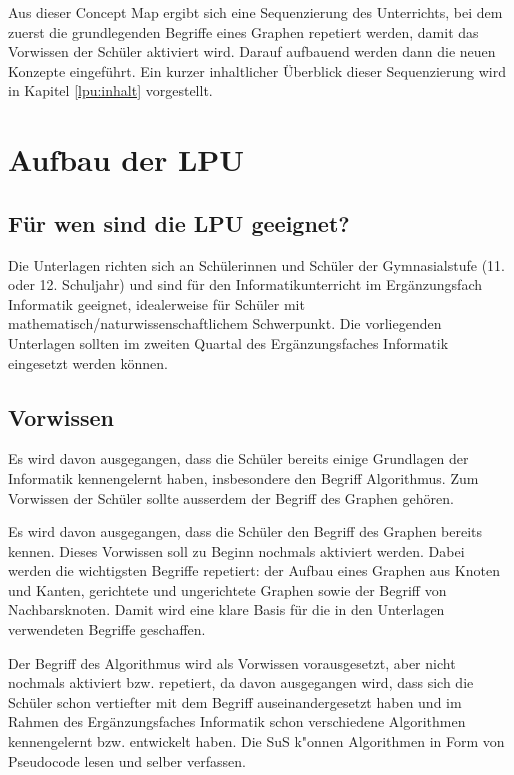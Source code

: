 Aus dieser Concept Map ergibt sich eine Sequenzierung des Unterrichts, bei dem zuerst die grundlegenden Begriffe eines Graphen repetiert werden, damit das Vorwissen der Sch\"uler aktiviert wird. Darauf aufbauend werden dann die neuen Konzepte eingef\"uhrt. Ein kurzer inhaltlicher \"Uberblick dieser Sequenzierung wird in Kapitel \ref{lpu:inhalt} vorgestellt.

\section{Aufbau der LPU}

\subsection{F\"ur wen sind die LPU geeignet?}
Die Unterlagen richten sich an Sch\"ulerinnen und Sch\"uler der Gymnasialstufe (11. oder 12. Schuljahr) und sind f\"ur den Informatikunterricht im Erg\"anzungsfach Informatik geeignet, idealerweise f\"ur Sch\"uler mit mathematisch/naturwissenschaftlichem Schwerpunkt. 
Die vorliegenden Unterlagen sollten im zweiten Quartal des Erg\"anzungsfaches Informatik eingesetzt werden k\"onnen.


\subsection{Vorwissen}

Es wird davon ausgegangen, dass die Sch\"uler bereits einige Grundlagen der Informatik kennengelernt haben, insbesondere den Begriff Algorithmus. Zum Vorwissen der Sch\"uler sollte ausserdem der Begriff des Graphen geh\"oren. 
  

Es wird davon ausgegangen, dass die Sch\"uler den Begriff des Graphen bereits kennen. Dieses Vorwissen soll zu Beginn nochmals aktiviert werden. Dabei werden die wichtigsten Begriffe repetiert: der Aufbau eines Graphen aus Knoten und Kanten, gerichtete und ungerichtete Graphen sowie der Begriff von Nachbarsknoten. Damit wird eine klare Basis f\"ur die in den Unterlagen verwendeten Begriffe geschaffen.

Der Begriff des Algorithmus wird als Vorwissen vorausgesetzt, aber nicht nochmals aktiviert bzw. repetiert, da davon ausgegangen wird, dass sich die Sch\"uler schon vertiefter mit dem Begriff auseinandergesetzt haben und im Rahmen des Erg\"anzungsfaches Informatik schon verschiedene Algorithmen kennengelernt bzw. entwickelt haben. 
Die SuS k"onnen Algorithmen in Form von Pseudocode lesen und selber verfassen.


